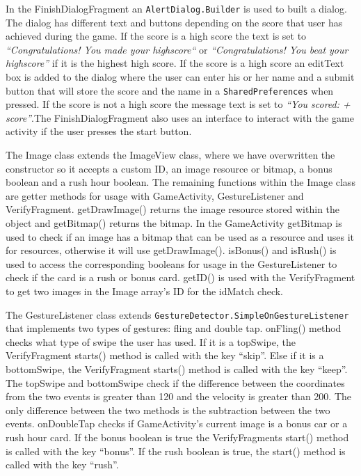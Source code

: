In the FinishDialogFragment an \verb|AlertDialog.Builder| is used to built a dialog. The dialog has different text and buttons depending on the score that user has achieved during the game. If the score is a high score the text is set to \emph{“Congratulations! You made your highscore“} or \emph{“Congratulations! You beat your highscore”} if it is the highest high score. If the score is a high score an editText box is added to the dialog where the user can enter his or her name and a submit button that will store the score and the name in a \verb|SharedPreferences| when pressed. If the score is not a high score the message text is set to \emph{“You scored: + score”}.The FinishDialogFragment also uses an interface to interact with the game activity if the user presses the start button. \newline

The Image class extends the ImageView class, where we have overwritten the constructor so it accepts a custom ID, an image resource or bitmap, a bonus boolean and a rush hour boolean. The remaining functions within the Image class are getter methods for usage with GameActivity, GestureListener and VerifyFragment. getDrawImage() returns the image resource stored within the object and getBitmap() returns the bitmap. In the GameActivity getBitmap is used to check if an image has a bitmap that can be used as a resource and uses it for resources, otherwise it will use getDrawImage(). isBonus() and isRush() is used to access the corresponding booleans for usage in the GestureListener to check if the card is a rush or bonus card. getID() is used with the VerifyFragment to get two images in the Image array’s ID for the idMatch check. \newline

\newpage
The GestureListener class extends \verb|GestureDetector.SimpleOnGestureListener| \\ that implements two types of gestures: fling and double tap. onFling() method checks what type of swipe the user has used. If it is a topSwipe, the VerifyFragment starts() method is called with the key “skip”. Else if it is a bottomSwipe, the VerifyFragment starts() method is called with the key “keep”. The topSwipe and bottomSwipe check if the difference between the coordinates from the two events is greater than 120 and the velocity is greater than 200. The only difference between the two methods is the subtraction between the two events. onDoubleTap checks if GameActivity’s current image is a bonus car or a rush hour card. If the bonus boolean is true the VerifyFragments start() method is called with the key “bonus”. If the rush boolean is true, the start() method is called with the key “rush”. \newline

